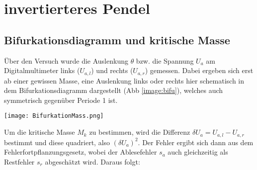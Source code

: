 

\section{invertierteres Pendel}
\label{sec:auswertungPendel}
\subsection{Bifurkationsdiagramm und kritische Masse}
\label{sub:bifuAndKritMass}
Über den Versuch wurde die Auslenkung $\theta$ bzw. die Spannung $U_a$ am Digitalmultimeter links ($U_{a,l}$) und rechts ($U_{a,r}$) gemessen. Dabei ergeben sich erst ab einer gewissen Masse, eine Auslenkung links oder rechts hier schematisch in dem Bifurkationsdiagramm dargestellt (Abb \ref{image:bifu}), welches auch symmetrisch gegenüber Periode 1 ist.
\begin{center}
    \texttt{[image: BifurkationMass.png]}
    \label{image:bifu}
\end{center}
Um die kritische Masse $M_k$ zu bestimmen, wird die Differenz $\delta U_a=U_{a,l}-U_{a,r}$ bestimmt und diese quadriert, also $(\delta U_a)^2$. Der Fehler ergibt sich dann aus dem Fehlerfortpflanzungsgesetz, wobei der Ablesefehler $s_a$ auch gleichzeitig als Restfehler $s_r$ abgeschätzt wird. Daraus folgt:
